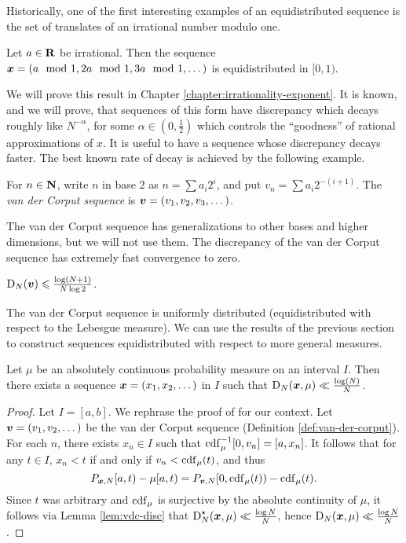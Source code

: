 Historically, one of the first interesting examples of an equidistributed 
sequence is the set of translates  of an irrational number modulo one. 

\begin{theorem}
Let $a\in \mathbf{R}$ be irrational. Then the sequence 
${\boldsymbol x}=(a\mod 1,2a\mod 1,3a\mod 1,\dots)$ is equidistributed in $[0,1)$. 
\end{theorem}

We will prove this result in Chapter \ref{chapter:irrationality-exponent}. It 
is known, and we will prove, that 
sequences of this form have discrepancy which decays roughly like 
$N^{-\alpha}$, for some $\alpha\in \left(0,\frac 1 2\right)$ which controls the 
``goodness'' of rational approximations of $x$. It is useful to have a sequence 
whose discrepancy decays faster. The best known rate of decay is achieved by 
the following example. 

\begin{definition}\label{def:van-der-corput}
For $n\in \mathbf{N}$, write $n$ in base $2$ as $n = \sum a_i 2^i$, and put 
$v_n = \sum a_i 2^{-(i+1)}$. The \emph{van der Corput sequence} is 
${\boldsymbol v} = (v_1,v_2,v_3,\dots)$.
\end{definition}

The van der Corput sequence has generalizations to other bases and higher 
dimensions, but we will not use them. The discrepancy of the van der Corput 
sequence has extremely fast convergence to zero. 

\begin{lemma}
\label{lem:vdc-disc}
$\operatorname{D}_N({\boldsymbol v}) \leqslant \frac{\log(N+1)}{N\log 2}$. 
\end{lemma}

The van der Corput sequence is uniformly distributed (equidistributed with 
respect to the Lebesgue measure). We can use the results of the previous 
section to construct sequences equidistributed with respect to more general 
measures. 

\begin{theorem}\label{thm:van-der-corput}
Let $\mu$ be an absolutely continuous probability measure on an interval $I$. 
Then there exists a sequence ${\boldsymbol x}=(x_1,x_2,\dots)$ in $I$ such that 
$\operatorname{D}_N({\boldsymbol x},\mu) \ll \frac{\log(N)}{N}$. 
\end{theorem}
\begin{proof}
Let $I = [a,b]$. We rephrase the proof of 
\cite[Ch.~2 Lem.~4.2]{kuipers-niederreiter-1974} for our context. Let 
${\boldsymbol v} = (v_1,v_2,\dots)$ be the van der Corput sequence (Definition 
\ref{def:van-der-corput}). For each $n$, there exists $x_n\in I$ such that 
$\operatorname{cdf}_\mu^{-1}[0,v_n] = [a,x_n]$. It follows that for any $t\in I$, $x_n < t$ 
if and only if $v_n < \operatorname{cdf}_\mu(t)$, and thus 
\[
	P_{{\boldsymbol x},N}[a,t) - \mu[a,t) = P_{{\boldsymbol v},N}[0,\operatorname{cdf}_\mu(t)) - \operatorname{cdf}_\mu(t) .
\]
Since $t$ was arbitrary and $\operatorname{cdf}_\mu$ is surjective by the absolute continuity 
of $\mu$, it follows via Lemma \ref{lem:vdc-disc} that 
$\operatorname{D}_N^\star({\boldsymbol x},\mu) \ll \frac{\log N}{N}$, hence 
$\operatorname{D}_N({\boldsymbol x},\mu) \ll \frac{\log N}{N}$. 
\end{proof}

